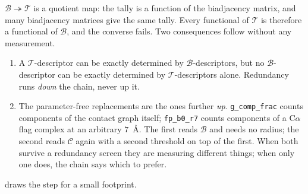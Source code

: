 \documentclass[11pt,a4paper]{article}
\newcommand{\dsc}[1]{\texttt{#1}}
\newcommand{\obj}[1]{\ensuremath{\mathcal{#1}}}
\begin{document}
$\obj{B} \twoheadrightarrow \obj{T}$ is a quotient map: the tally is a function of the biadjacency
matrix, and many biadjacency matrices give the same tally. Every functional of \obj{T} is therefore
a functional of \obj{B}, and the converse fails. Two consequences follow without any measurement.

\begin{enumerate}
\item A \obj{T}-descriptor can be exactly determined by \obj{B}-descriptors, but no
  \obj{B}-descriptor can be exactly determined by \obj{T}-descriptors alone. Redundancy runs
  \emph{down} the chain, never up it.
\item The parameter-free replacements are the ones further \emph{up}. \dsc{g\_comp\_frac} counts
  components of the contact graph itself; \dsc{fp\_b0\_r7} counts components of a C$\alpha$ flag
  complex at an arbitrary $7$~\AA. The first reads \obj{B} and needs no radius; the second reads
  \obj{C} again with a second threshold on top of the first. When both survive a redundancy screen
  they are measuring different things; when only one does, the chain says which to prefer.
\end{enumerate}

 draws the step for a small footprint.
\end{document}
